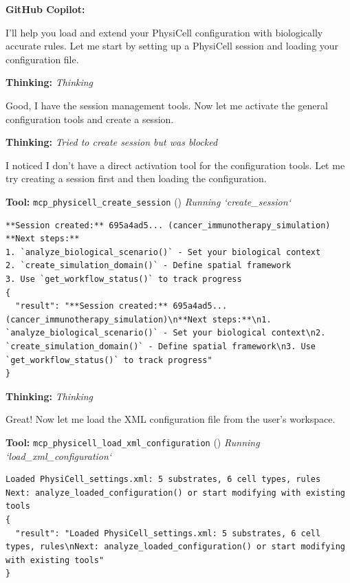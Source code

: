 \documentclass[11pt,a4paper]{article}
\begin{document}
\begin{copilotbox}
\textbf{GitHub Copilot:}

I'll help you load and extend your PhysiCell configuration with biologically accurate rules. Let me start by setting up a PhysiCell session and loading your configuration file.

\end{copilotbox}
\begin{thinkbox}
\textbf{Thinking:} \textit{Thinking}

Good, I have the session management tools. Now let me activate the general configuration tools and create a session.

\end{thinkbox}
\begin{thinkbox}
\textbf{Thinking:} \textit{Tried to create session but was blocked}

I noticed I don't have a direct activation tool for the configuration tools. Let me try creating a session first and then loading the configuration.

\end{thinkbox}
\begin{toolokbox}
\textbf{Tool:} \texttt{mcp\_physicell\_create\_session} (\checkmark)
\textit{Running `create\_session`}
\begin{lstlisting}
**Session created:** 695a4ad5... (cancer_immunotherapy_simulation)
**Next steps:**
1. `analyze_biological_scenario()` - Set your biological context
2. `create_simulation_domain()` - Define spatial framework
3. Use `get_workflow_status()` to track progress
{
  "result": "**Session created:** 695a4ad5... (cancer_immunotherapy_simulation)\n**Next steps:**\n1. `analyze_biological_scenario()` - Set your biological context\n2. `create_simulation_domain()` - Define spatial framework\n3. Use `get_workflow_status()` to track progress"
}
\end{lstlisting}
\end{toolokbox}
\begin{thinkbox}
\textbf{Thinking:} \textit{Thinking}

Great! Now let me load the XML configuration file from the user's workspace.

\end{thinkbox}
\begin{toolokbox}
\textbf{Tool:} \texttt{mcp\_physicell\_load\_xml\_configuration} (\checkmark)
\textit{Running `load\_xml\_configuration`}
\begin{lstlisting}
Loaded PhysiCell_settings.xml: 5 substrates, 6 cell types, rules
Next: analyze_loaded_configuration() or start modifying with existing tools
{
  "result": "Loaded PhysiCell_settings.xml: 5 substrates, 6 cell types, rules\nNext: analyze_loaded_configuration() or start modifying with existing tools"
}
\end{lstlisting}
\end{toolokbox}
\end{document}
